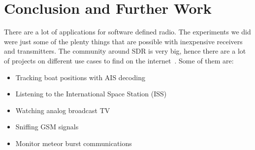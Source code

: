 \documentclass[conference]{IEEEtran}
\begin{document}
\section{Conclusion and Further Work}
There are a lot of applications for software defined radio. The experiments we did were just some of the plenty things that are possible with inexpensive receivers and transmitters. The community around SDR is very big, hence there are a lot of projects on different use cases to find on the internet~\cite{rtl-sdr}. Some of them are:

\begin{itemize}
	\item Tracking boat positions with AIS decoding  \cite{ais-ship-tracking}
	\item Listening to the International Space Station (ISS) \cite{iss-listening}
	\item Watching analog broadcast TV  \cite{analogue-tv-sdr}
	\item Sniffing GSM signals  \cite{analyzing-gsm}
	\item Monitor meteor burst communications  \cite{meteor-reflection}
\end{itemize}



\end{document}
